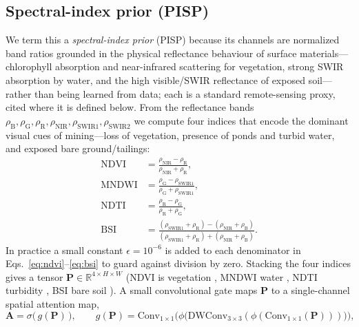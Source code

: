 \documentclass[review]{elsarticle}
\begin{document}
\subsection{Spectral-index prior (PISP)}\label{sec:pisp}
We term this a \emph{spectral-index prior} (PISP) because its channels are normalized band ratios
grounded in the physical reflectance behaviour of surface materials---chlorophyll
absorption and near-infrared scattering for vegetation, strong SWIR absorption by water,
and the high visible/SWIR reflectance of exposed soil---rather than being learned from data; each is a standard remote-sensing proxy, cited where
it is defined below. From the reflectance bands
$\rho_{\mathrm{B}},\rho_{\mathrm{G}},\rho_{\mathrm{R}},\rho_{\mathrm{NIR}},
\rho_{\mathrm{SWIR1}},\rho_{\mathrm{SWIR2}}$ we compute four indices that encode the
dominant visual cues of mining---loss of vegetation, presence of ponds and turbid water,
and exposed bare ground/tailings:
\begin{align}
\mathrm{NDVI}  &= \frac{\rho_{\mathrm{NIR}}-\rho_{\mathrm{R}}}{\rho_{\mathrm{NIR}}+\rho_{\mathrm{R}}}, \label{eq:ndvi}\\[2pt]
\mathrm{MNDWI} &= \frac{\rho_{\mathrm{G}}-\rho_{\mathrm{SWIR1}}}{\rho_{\mathrm{G}}+\rho_{\mathrm{SWIR1}}}, \label{eq:mndwi}\\[2pt]
\mathrm{NDTI}  &= \frac{\rho_{\mathrm{R}}-\rho_{\mathrm{G}}}{\rho_{\mathrm{R}}+\rho_{\mathrm{G}}}, \label{eq:ndti}\\[2pt]
\mathrm{BSI}   &= \frac{(\rho_{\mathrm{SWIR1}}+\rho_{\mathrm{R}})-(\rho_{\mathrm{NIR}}+\rho_{\mathrm{B}})}
                       {(\rho_{\mathrm{SWIR1}}+\rho_{\mathrm{R}})+(\rho_{\mathrm{NIR}}+\rho_{\mathrm{B}})}. \label{eq:bsi}
\end{align}
In practice a small constant $\epsilon=10^{-6}$ is added to each denominator in
Eqs.~\eqref{eq:ndvi}--\eqref{eq:bsi} to guard against division by zero. Stacking the four
indices gives a tensor
$\mathbf{P}\in\mathbb{R}^{4\times H\times W}$ (NDVI is vegetation
\citep{rouse1974ndvi}, MNDWI water \citep{xu2006mndwi}, NDTI turbidity
\citep{lacaux2007ndti}, BSI bare soil \citep{rikimaru2002bsi}). A small convolutional gate maps $\mathbf{P}$ to a single-channel
spatial attention map,
\begin{equation}
\mathbf{A} = \sigma\!\big(\, g(\mathbf{P}) \,\big),\qquad
g(\mathbf{P}) = \mathrm{Conv}_{1\times1}\!\big(\phi\big(\mathrm{DWConv}_{3\times3}(\phi(\mathrm{Conv}_{1\times1}(\mathbf{P})))\big)\big),
\label{eq:gate}
\end{equation}
\end{document}
